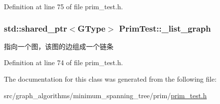 Definition at line 75 of file prim\+\_\+test.\+h.

\hypertarget{class_prim_test_aeac490b81dfcef56b2a8b656942b012a}{}
\subsubsection[{\+\_\+list\+\_\+graph}]{\setlength{\rightskip}{0pt plus 5cm}std\+::shared\+\_\+ptr$<${\bf G\+Type}$>$ Prim\+Test\+::\+\_\+list\+\_\+graph\hspace{0.3cm}{\ttfamily [protected]}}\label{class_prim_test_aeac490b81dfcef56b2a8b656942b012a}
指向一个图，该图的边组成一个链条 

Definition at line 74 of file prim\+\_\+test.\+h.



The documentation for this class was generated from the following file\+:\begin{DoxyCompactItemize}
\item 
src/graph\+\_\+algorithms/minimum\+\_\+spanning\+\_\+tree/prim/\hyperlink{prim__test_8h}{prim\+\_\+test.\+h}\end{DoxyCompactItemize}
